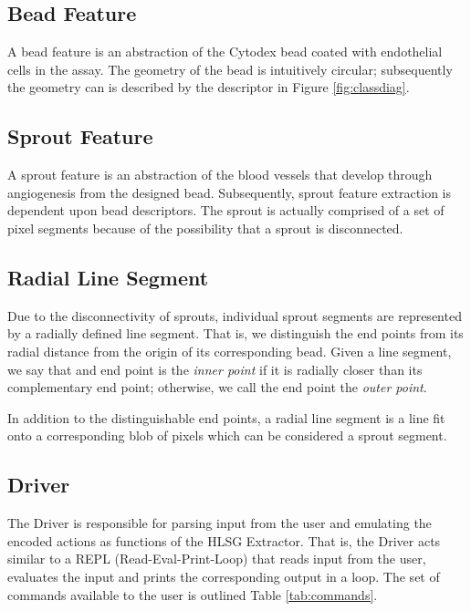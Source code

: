 \documentclass{sig-alternate}
\begin{document}
	\subsection{Bead Feature} %
	\label{sub:Bead Feature}
		A bead feature is an abstraction of the Cytodex bead coated with
		endothelial cells in the assay. The geometry of the bead is intuitively
		circular; subsequently the geometry can is described by the descriptor
		in Figure \ref{fig:classdiag}.

	\subsection{Sprout Feature} %
	\label{sub:Sprout Feature}
		A sprout feature is an abstraction of the blood vessels that develop
		through angiogenesis from the designed bead. Subsequently, sprout
		feature extraction is dependent upon bead descriptors. The sprout is
		actually comprised of a set of pixel segments because of the
		possibility that a sprout is disconnected.

	\subsection{Radial Line Segment} %
	\label{sub:Radial Line Segment}
		Due to the disconnectivity of sprouts, individual sprout segments
		are represented by a radially defined line segment. That is, we
		distinguish the end points from its radial distance from the origin
		of its corresponding bead. Given a line segment, we say that and
		end point is the \emph{inner point} if it is radially closer than
		its complementary end point; otherwise, we call the end point the
		\emph{outer point}.

		In addition to the distinguishable end points, a radial line
		segment is a line fit onto a corresponding blob of pixels which can
		be considered a sprout segment.

	\subsection{Driver} %
	\label{sub:Driver}
		The Driver is responsible for parsing input from the user and emulating
		the encoded actions as functions of the HLSG Extractor. That is, the
		Driver acts similar to a REPL (Read-Eval-Print-Loop) that reads input
		from the user, evaluates the input and prints the corresponding output
		in a loop.  The set of commands available to the user is outlined Table
		\ref{tab:commands}.
\end{document}
